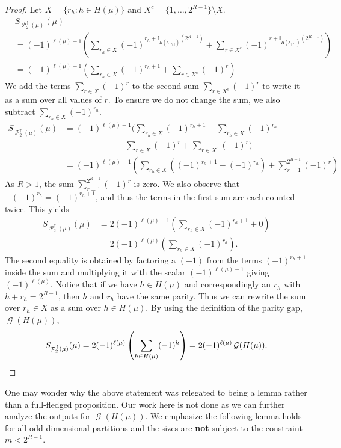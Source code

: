 \documentclass[12pt]{amsart}
\theoremstyle{definition}
\numberwithin{equation}{section}
\DeclareMathOperator{\p}{\mathcal{P}}
\DeclareMathOperator{\g}{\mathcal{G}}
\begin{document}
\begin{proof}
Let $X = \{r_h : h\in H(\mu)\}$ and $X^c = \{1, \ldots, 2^{R-1}\}\setminus X$.
\begin{align*}
&S_{\p_2^\uparrow(\mu)}(\mu)\\ &= (-1)^{\ell(\mu)-1}\left(\sum\limits_{r_h \in X} (-1)^{r_h +\mathbb{I}_{H(\lambda_{[r_h]})}(2^{R-1})} +\sum\limits_{r\in X^c} (-1)^{r +\mathbb{I}_{H(\lambda_{[r]})}(2^{R-1})}\right)\\
&= (-1)^{\ell(\mu)-1}\left(\sum\limits_{r_h\in X} (-1)^{r_h + 1} +\sum\limits_{r\in X^c} (-1)^{r}\right)
\end{align*}
We add the terms $\sum\limits_{r\in X} (-1)^{r}$  to the second sum $\sum\limits_{r\in X^c} (-1)^{r}$ to write it as a sum over all values of $r$. To ensure we do not change the sum, we also subtract $\sum\limits_{r_h\in X} (-1)^{r_h}$.
\begin{align*}
S_{\p_2^\uparrow(\mu)}(\mu)&= (-1)^{\ell(\mu)-1}\Bigg(\sum\limits_{r_h\in X} (-1)^{r_h + 1} - \sum\limits_{r_h\in X} (-1)^{r_h} 
\\
  & \qquad\qquad\qquad+\sum\limits_{r\in X} (-1)^{r} 
 +\sum\limits_{r\in X^c} (-1)^{r}\Bigg) \\
&= (-1)^{\ell(\mu)-1}\left(\sum\limits_{r_h\in X} \left((-1)^{r_h + 1} - (-1)^{r_h}\right) +\sum\limits_{r=1}^{2^{R-1}} (-1)^{r}\right)
\end{align*}
As $R> 1$, the sum $\sum\limits_{r=1}^{2^{R-1}} (-1)^{r}$ is zero. We also observe that $-(-1)^{r_h} = (-1)^{r_h+1}$, and thus the terms in the first sum are each counted twice. This yields
\begin{align*}
S_{\p_2^\uparrow(\mu)}(\mu)&= 2(-1)^{\ell(\mu)-1}\left(\sum\limits_{r_h\in X} (-1)^{r_h+1}+0\right)\\
&=  2(-1)^{\ell(\mu)}\left(\sum\limits_{r_h\in X} (-1)^{r_h}\right).
\end{align*}
The second equality is obtained by factoring a $(-1)$ from the terms $(-1)^{r_h+1}$ inside the sum and multiplying it with the scalar $(-1)^{\ell(\mu)-1}$ giving $(-1)^{\ell(\mu)}$. Notice that if we have $h\in H(\mu)$ and correspondingly an $r_h$ with $h+r_h = 2^{R-1}$, then $h$ and $r_h$ have the same parity. Thus we can rewrite the sum over $r_h\in X$ as a sum over $h\in H(\mu)$. By using the definition of the parity gap, $\g(H(\mu))$,
\[
S_{\p_2^\uparrow(\mu)}(\mu)=2(-1)^{\ell(\mu)}\left(\sum\limits_{\substack{h\in H(\mu)}} (-1)^{h}\right)=
2(-1)^{\ell(\mu)}\g(H(\mu)).\qedhere
\]
\end{proof}
One may wonder why the above statement was relegated to being a lemma rather than a full-fledged proposition. Our work here is not done as we can further analyze the outputs for $\g(H(\mu))$. We emphasize the following lemma holds for all odd-dimensional partitions and the sizes are \textbf{not} subject to the constraint $m < 2^{R-1}$.
\end{document}

